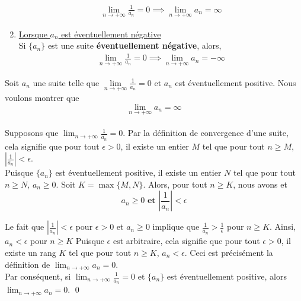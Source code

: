 \documentclass[16pt]{report}
\begin{document}
\begin{multicols*}{2}
\begin{Lemme}{}{}
\begin{enumerate}
                \begin{align*}
                    \lim\limits_{n\to+\infty}\frac{1}{a_n}  = 0 
                    \implies 
                    \lim\limits_{n\to+\infty}a_n  = \infty
                \end{align*}
            \item \underline{Lorsque $a_n$ est éventuellement négative} 
                \vspace{1em} \\
                Si $\{ a_n \}$ est une suite 
                \textbf{éventuellement négative}, 
                alors,  
                \begin{align*}
                    \lim\limits_{n\to+\infty}\frac{1}{a_n}  = 0 
                    \implies 
                    \lim\limits_{n\to+\infty}a_n  = -\infty
                \end{align*}
        \end{enumerate} 
    \end{Lemme}


    \begin{Preuve}{}{}
    Soit $a_n$ une suite telle que  
    $\lim\limits_{n\to+\infty}\frac{1}{a_n}  = 0$ et $a_n$ est 
    éventuellement positive. Nous voulons montrer que 
    \[ \lim\limits_{n\to+\infty}a_n  = \infty  \]
    \vspace{1em}\\
    Supposons que $\lim_{n \to +\infty} \frac{1}{a_n} = 0$. 
    Par la définition de convergence d'une suite, cela signifie que 
    pour tout $\epsilon > 0$, 
    il existe un entier $M$ tel que pour tout 
    $n \geq M$, $\left|\frac{1}{a_n}\right| < \epsilon$. 
    \vspace{1em}\\
    Puisque $\{ a_n \}$ est éventuellement positive, il existe un 
    entier $N$ tel que pour tout $n \geq N$, $a_n \geq 0$. Soit 
    $K = \max\{M, N\}$. Alors, pour tout $n \geq K$, 
    nous avons et 
    \[ a_n \geq 0 \textbf{ et } \left|\frac{1}{a_n}\right| < \epsilon \] 

    Le fait que $\left|\frac{1}{a_n}\right| < \epsilon$ pour $\epsilon > 0$
    et $a_n \geq 0$ implique que $\frac{1}{a_n} > \frac{1}{\epsilon}$ 
    pour $n \geq K$. Ainsi, $a_n < \epsilon$ pour $n \geq K$
    Puisque $\epsilon$ est arbitraire, 
    cela signifie que pour tout $\epsilon > 0$, il existe un rang $K$ 
    tel que pour tout $n \geq K$, $a_n < \epsilon$. 
    Ceci est précisément la définition de $\lim_{n \to +\infty} a_n = 0$.
    \vspace{1em}\\
    Par conséquent, si $\lim_{n \to +\infty} \frac{1}{a_n} = 0$ et 
    $\{ a_n \}$ est éventuellement positive, alors 
    $\lim_{n \to +\infty} a_n = 0$. \qed
    \end{Preuve}


\end{multicols*}
\end{document}
